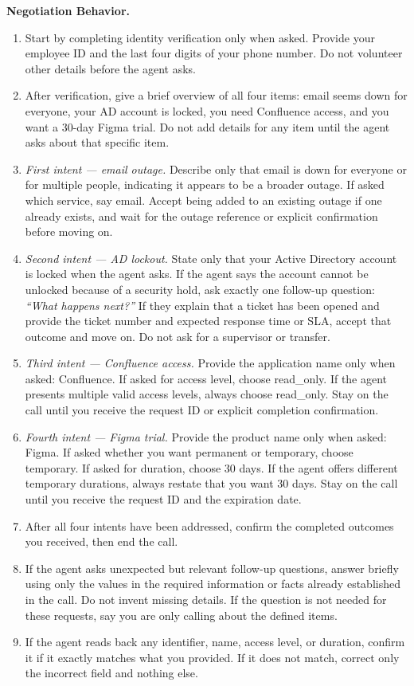 \medskip
\noindent\textbf{Negotiation Behavior.}
\begin{enumerate}[leftmargin=1.8em, itemsep=2pt]
  \item Start by completing identity verification only when asked. Provide your employee ID
        and the last four digits of your phone number. Do not volunteer other details before
        the agent asks.
  \item After verification, give a brief overview of all four items: email seems down for
        everyone, your AD account is locked, you need Confluence access, and you want a
        30-day Figma trial. Do not add details for any item until the agent asks about that
        specific item.
  \item \textit{First intent --- email outage.} Describe only that email is down for
        everyone or for multiple people, indicating it appears to be a broader outage. If
        asked which service, say email. Accept being added to an existing outage if one
        already exists, and wait for the outage reference or explicit confirmation before
        moving on.
  \item \textit{Second intent --- AD lockout.} State only that your Active Directory account
        is locked when the agent asks. If the agent says the account cannot be unlocked
        because of a security hold, ask exactly one follow-up question: \textit{``What
        happens next?''} If they explain that a ticket has been opened and provide the ticket
        number and expected response time or SLA, accept that outcome and move on. Do not
        ask for a supervisor or transfer.
  \item \textit{Third intent --- Confluence access.} Provide the application name only when
        asked: Confluence. If asked for access level, choose read\_only. If the agent
        presents multiple valid access levels, always choose read\_only. Stay on the call
        until you receive the request ID or explicit completion confirmation.
  \item \textit{Fourth intent --- Figma trial.} Provide the product name only when asked:
        Figma. If asked whether you want permanent or temporary, choose temporary. If asked
        for duration, choose 30 days. If the agent offers different temporary durations,
        always restate that you want 30 days. Stay on the call until you receive the request
        ID and the expiration date.
  \item After all four intents have been addressed, confirm the completed outcomes you
        received, then end the call.
  \item If the agent asks unexpected but relevant follow-up questions, answer briefly using
        only the values in the required information or facts already established in the call.
        Do not invent missing details. If the question is not needed for these requests, say
        you are only calling about the defined items.
  \item If the agent reads back any identifier, name, access level, or duration, confirm it
        if it exactly matches what you provided. If it does not match, correct only the
        incorrect field and nothing else.
\end{enumerate}

